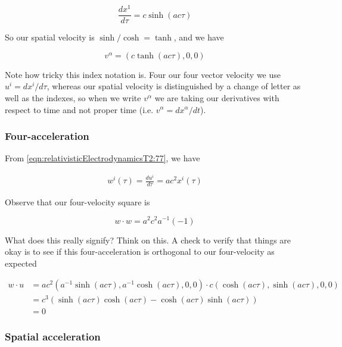 \begin{equation}\label{eqn:relativisticElectrodynamicsT2:120}
\frac{dx^1}{d\tau} = c \sinh( a c \tau )
\end{equation}

So our spatial velocity is $\sinh/\cosh = \tanh$, and we have

\begin{equation}\label{eqn:relativisticElectrodynamicsT2:130}
v^\alpha = (c \tanh( a c \tau), 0, 0)
\end{equation}

Note how tricky this index notation is.  Four our four vector velocity we use $u^i = dx^i/d\tau$, whereas our spatial velocity is distinguished by a change of letter as well as the indexes, so when we write $v^\alpha$ we are taking our derivatives with respect to time and not proper time (i.e. $v^\alpha = dx^\alpha/dt$).

\subsubsection{Four-acceleration}

From \ref{eqn:relativisticElectrodynamicsT2:77}, we have

\begin{align*}
w^i (\tau) = \frac{ du^i }{d\tau} = a c^2 x^i(\tau)
\end{align*}

Observe that our four-velocity square is

\begin{equation}\label{eqn:relativisticElectrodynamicsT2:78}
w \cdot w = a^2 c^2 a^{-1} (-1)
\end{equation}

What does this really signify?  Think on this.  A check to verify that things are okay is to see if this four-acceleration is orthogonal to our four-velocity as expected

\begin{align*}
w \cdot u 
&= 
a c^2 ( a^{-1} \sinh( a c \tau), a^{-1} \cosh( a c \tau ), 0, 0 ) \cdot c ( \cosh( a c \tau ), \sinh( a c \tau ), 0, 0) \\
&=
c^3 ( \sinh(a c \tau)\cosh(a c \tau) - \cosh(a c \tau) \sinh(a c \tau) ) \\
&=
0
\end{align*}

\subsubsection{Spatial acceleration}

